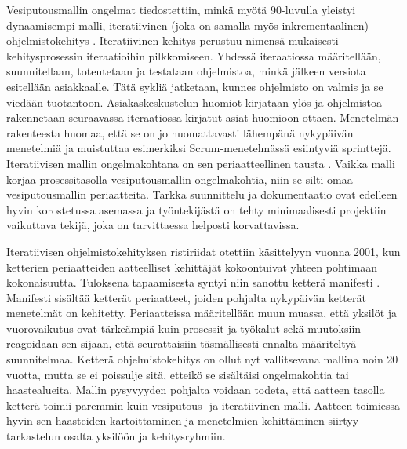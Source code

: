 Vesiputousmallin ongelmat tiedostettiin, minkä myötä 90-luvulla yleistyi dynaamisempi malli, iteratiivinen (joka on samalla myös inkrementaalinen) ohjelmistokehitys \cite{1204375}. Iteratiivinen kehitys perustuu nimensä mukaisesti kehitysprosessin iteraatioihin pilkkomiseen. Yhdessä iteraatiossa määritellään, suunnitellaan, toteutetaan ja testataan ohjelmistoa, minkä jälkeen versiota esitellään asiakkaalle. Tätä sykliä jatketaan, kunnes ohjelmisto on valmis ja se viedään tuotantoon. Asiakaskeskustelun huomiot kirjataan ylös ja ohjelmistoa rakennetaan seuraavassa iteraatiossa kirjatut asiat huomioon ottaen. Menetelmän rakenteesta huomaa, että se on jo huomattavasti lähempänä nykypäivän menetelmiä ja muistuttaa esimerkiksi Scrum-menetelmässä \cite{SCRUMORG} esiintyviä sprinttejä. Iteratiivisen mallin ongelmakohtana on sen periaatteellinen tausta \cite{1204375}. Vaikka malli korjaa prosessitasolla vesiputousmallin ongelmakohtia, niin se silti omaa vesiputousmallin periaatteita. Tarkka suunnittelu ja dokumentaatio ovat edelleen hyvin korostetussa asemassa ja työntekijästä on tehty minimaalisesti projektiin vaikuttava tekijä, joka on tarvittaessa helposti korvattavissa.

Iteratiivisen ohjelmistokehityksen ristiriidat otettiin käsittelyyn vuonna 2001, kun ketterien periaatteiden aatteelliset kehittäjät kokoontuivat yhteen pohtimaan kokonaisuutta. Tuloksena tapaamisesta syntyi niin sanottu ketterä manifesti \cite{beck2001agile}. Manifesti sisältää ketterät periaatteet, joiden pohjalta nykypäivän ketterät menetelmät on kehitetty. Periaatteissa määritellään muun muassa, että yksilöt ja vuorovaikutus ovat tärkeämpiä kuin prosessit ja työkalut sekä muutoksiin reagoidaan sen sijaan, että seurattaisiin täsmällisesti ennalta määriteltyä suunnitelmaa. Ketterä ohjelmistokehitys on ollut nyt vallitsevana mallina noin 20 vuotta, mutta se ei poissulje sitä, etteikö se sisältäisi ongelmakohtia tai haastealueita. Mallin pysyvyyden pohjalta voidaan todeta, että aatteen tasolla ketterä toimii paremmin kuin vesiputous- ja iteratiivinen malli. Aatteen toimiessa hyvin sen haasteiden kartoittaminen ja menetelmien kehittäminen siirtyy tarkastelun osalta yksilöön ja kehitysryhmiin.

